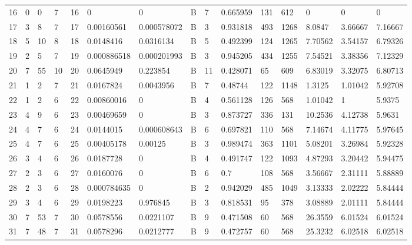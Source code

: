 \begin{latin}
\begin{longtable}{lllllllllllllll}
	16  & 0  & 0   & 7  & 16  & 0              & 0              & B & 7  & 0.665959 & 131  & 612  & 0       & 0       & 0       \\
	17  & 3  & 8   & 7  & 17  & 0.00160561     & 0.000578072    & B & 3  & 0.931818 & 493  & 1268 & 8.0847  & 3.66667 & 7.16667 \\
	18  & 5  & 10  & 8  & 18  & 0.0148416      & 0.0316134      & B & 5  & 0.492399 & 124  & 1265 & 7.70562 & 3.54157 & 6.79326 \\
	19  & 2  & 5   & 7  & 19  & 0.000886518    & 0.000201993    & B & 3  & 0.945205 & 434  & 1255 & 7.54521 & 3.38356 & 7.12329 \\
	20  & 7  & 55  & 10 & 20  & 0.0645949      & 0.223854       & B & 11 & 0.428071 & 65   & 609  & 6.83019 & 3.32075 & 6.80713 \\
	21  & 1  & 2   & 7  & 21  & 0.0167824      & 0.0043956      & B & 7  & 0.48744  & 122  & 1148 & 1.3125  & 1.01042 & 5.92708 \\
	22  & 1  & 2   & 6  & 22  & 0.00860016     & 0              & B & 4  & 0.561128 & 126  & 568  & 1.01042 & 1       & 5.9375  \\
	23  & 4  & 9   & 6  & 23  & 0.00469659     & 0              & B & 3  & 0.873727 & 336  & 131  & 10.2536 & 4.12738 & 5.9631  \\
	24  & 4  & 7   & 6  & 24  & 0.0144015      & 0.000608643    & B & 6  & 0.697821 & 110  & 568  & 7.14674 & 4.11775 & 5.97645 \\
	25  & 4  & 7   & 6  & 25  & 0.00405178     & 0.00125        & B & 3  & 0.989474 & 363  & 1101 & 5.08201 & 3.26984 & 5.92328 \\
	26  & 3  & 4   & 6  & 26  & 0.0187728      & 0              & B & 4  & 0.491747 & 122  & 1093 & 4.87293 & 3.20442 & 5.94475 \\
	27  & 2  & 3   & 6  & 27  & 0.0160076      & 0              & B & 6  & 0.7      & 108  & 568  & 3.56667 & 2.31111 & 5.88889 \\
	28  & 2  & 3   & 6  & 28  & 0.000784635    & 0              & B & 2  & 0.942029 & 485  & 1049 & 3.13333 & 2.02222 & 5.84444 \\
	29  & 3  & 4   & 6  & 29  & 0.0198223      & 0.976845       & B & 3  & 0.818531 & 95   & 378  & 3.08889 & 2.01111 & 5.84444 \\
	30  & 7  & 53  & 7  & 30  & 0.0578556      & 0.0221107      & B & 9  & 0.471508 & 60   & 568  & 26.3559 & 6.01524 & 6.01524 \\
	31  & 7  & 48  & 7  & 31  & 0.0578296      & 0.0212777      & B & 9  & 0.472757 & 60   & 568  & 25.3232 & 6.02518 & 6.02518 \\

\end{longtable}
\end{latin}
